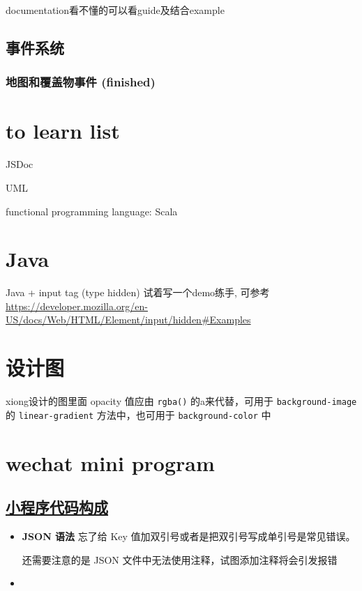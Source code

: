 \documentclass[a4paper, 12pt]{article}
\begin{document}
documentation看不懂的可以看guide及结合example

\subsection{事件系统}
\subsubsection{地图和覆盖物事件 (finished)}


\section{to learn list}
JSDoc

UML

functional programming language: Scala


\section{Java}
Java + input tag (type hidden) 试着写一个demo练手, 可参考 \url{https://developer.mozilla.org/en-US/docs/Web/HTML/Element/input/hidden#Examples}


\section{设计图}
xiong设计的图里面 opacity 值应由 \verb|rgba()| 的a来代替，可用于 \verb|background-image| 的 \verb|linear-gradient| 方法中，也可用于 \verb|background-color| 中


\section{wechat mini program}

\subsection{\href{https://developers.weixin.qq.com/miniprogram/dev/framework/quickstart/code.html}{小程序代码构成}}
\begin{itemize}
\item \textbf{JSON 语法} 忘了给 Key 值加双引号或者是把双引号写成单引号是常见错误。

还需要注意的是 JSON 文件中无法使用注释，试图添加注释将会引发报错

\item 

\end{itemize}
\end{document}
